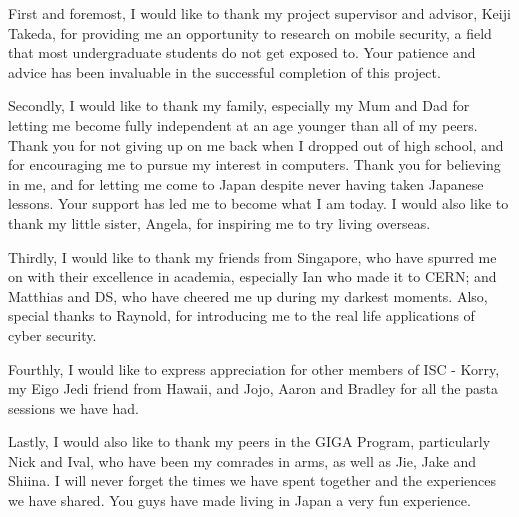 \documentclass[
11pt, %
english, %
singlespacing, %
headsepline, %
openright, %
]{MastersDoctoralThesis} %
\numberwithin{figure}{section} %
\numberwithin{equation}{section} %
\begin{document}

\begin{acknowledgements}
\addchaptertocentry{\acknowledgementname} %
First and foremost, I would like to thank my project supervisor and advisor, Keiji Takeda, for providing me an opportunity to research on mobile security, a field that most undergraduate students do not get exposed to. Your patience and advice has been invaluable in the successful completion of this project. 

Secondly, I would like to thank my family, especially my Mum and Dad for letting me become fully independent at an age younger than all of my peers. Thank you for not giving up on me back when I dropped out of high school, and for encouraging me to pursue my interest in computers. Thank you for believing in me, and for letting me come to Japan despite never having taken Japanese lessons. Your support has led me to become what I am today. I would also like to thank my little sister, Angela, for inspiring me to try living overseas.

Thirdly, I would like to thank my friends from Singapore, who have spurred me on with their excellence in academia, especially Ian who made it to CERN; and Matthias and DS, who have cheered me up during my darkest moments. Also, special thanks to Raynold, for introducing me to the real life applications of cyber security.

Fourthly, I would like to express appreciation for other members of ISC - Korry, my Eigo Jedi friend from Hawaii, and Jojo, Aaron and Bradley for all the pasta sessions we have had.

Lastly, I would also like to thank my peers in the GIGA Program, particularly Nick and Ival, who have been my comrades in arms, as well as Jie, Jake and Shiina. I will never forget the times we have spent together and the experiences we have shared. You guys have made living in Japan a very fun experience.

\end{acknowledgements}

\hypersetup{linkcolor=black} %
\tableofcontents %
\end{document}
